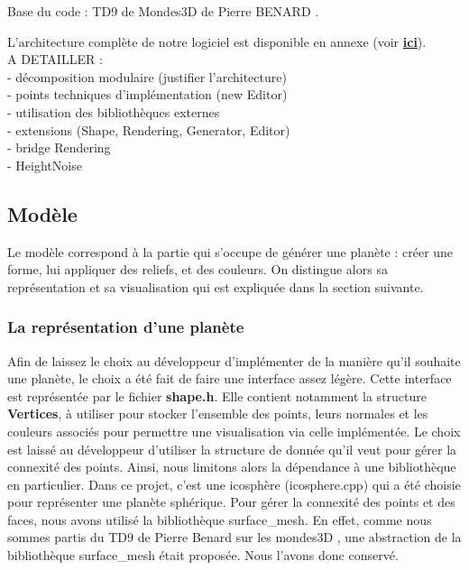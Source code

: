 \documentclass[a4paper]{article}
\begin{document}

Base du code : TD9 de Mondes3D de Pierre BENARD \cite{TD_3D}.

L'architecture complète de notre logiciel est disponible en annexe (voir \hyperref[archiComplete]{\textbf{ici}}). 
\\

A DETAILLER :\\
- décomposition modulaire (justifier l'architecture)\\
- points techniques d’implémentation (new Editor)\\
- utilisation des bibliothèques externes\\
- extensions (Shape, Rendering, Generator, Editor)\\
- bridge Rendering\\
- HeightNoise


\subsection{Modèle}
Le modèle correspond à la partie qui s'occupe de générer une planète : créer une forme, lui appliquer des reliefs, et des couleurs. On distingue alors sa représentation et sa visualisation qui est expliquée dans la section suivante.

\subsubsection{La représentation d'une planète}
Afin de laissez le choix au développeur d'implémenter de la manière qu'il souhaite une planète, le choix a été fait de faire une interface assez légère. Cette interface est représentée par le fichier \textbf{shape.h}. Elle contient notamment la structure \textbf{Vertices}, à utiliser pour stocker l'ensemble des points, leurs normales et les couleurs associés pour permettre une visualisation via celle implémentée. Le choix est laissé au développeur d'utiliser la structure de donnée qu'il veut pour gérer la connexité des points. Ainsi, nous limitons alors la dépendance à une bibliothèque en particulier. 
Dans ce projet, c'est une icosphère (icosphere.cpp) qui a été choisie pour représenter une planète sphérique. Pour gérer la connexité des points et des faces, nous avons utilisé la bibliothèque surface\_mesh. En effet, comme nous sommes partis du TD9 de Pierre Benard sur les mondes3D \cite{TD_3D}, une abstraction de la bibliothèque surface\_mesh était proposée. Nous l'avons donc conservé.
\end{document}
